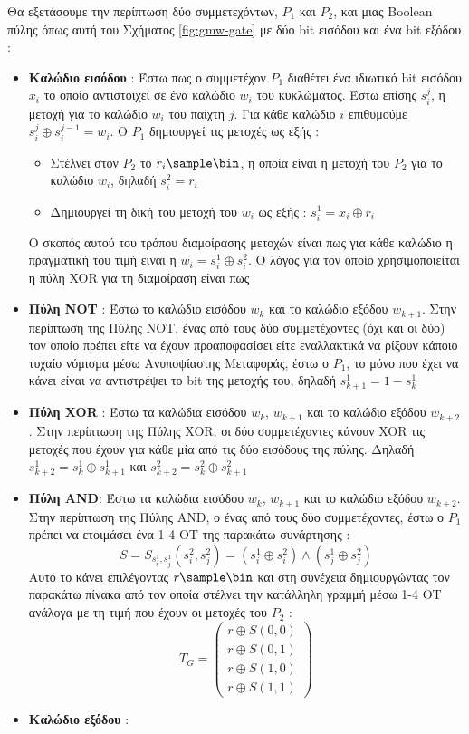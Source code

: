 Θα εξετάσουμε την περίπτωση δύο συμμετεχόντων, $P_1$ και $P_2$, και μιας Boolean πύλης όπως αυτή του Σχήματος \ref{fig:gmw-gate} με δύο bit εισόδου και ένα bit εξόδου :
\begin{itemize}
    \item \textbf{Καλώδιο εισόδου} : Έστω πως ο συμμετέχον $P_1$ διαθέτει ένα ιδιωτικό bit εισόδου $x_i$ το οποίο αντιστοιχεί σε ένα καλώδιο $w_i$ του κυκλώματος. Έστω επίσης $s_i^j$, η μετοχή για το καλώδιο $w_i$ του παίχτη $j$. Για κάθε καλώδιο $i$ επιθυμούμε $s_i^j \oplus s_i^{j-1} = w_i$. Ο $P_1$ δημιουργεί τις μετοχές ως εξής :
    \begin{itemize}
        \item Στέλνει στον $P_2$ το $r_i \sample \bin$, η οποία είναι η μετοχή του $P_2$ για το καλώδιο $w_i$, δηλαδή $s_i^2 = r_i$
        \item Δημιουργεί τη δική του μετοχή του $w_i$ ως εξής : $s_i^1 = x_i \oplus r_i$
    \end{itemize}
    Ο σκοπός αυτού του τρόπου διαμοίρασης μετοχών είναι πως για κάθε καλώδιο η πραγματική του τιμή είναι η $w_i = s_i^1 \oplus s_i^2$. Ο λόγος για τον οποίο χρησιμοποιείται η πύλη XOR για τη διαμοίραση είναι πως
    \item \textbf{Πύλη NOT} : Έστω το καλώδιο εισόδου $w_k$ και το καλώδιο εξόδου $w_{k+1}$. Στην περίπτωση της Πύλης NOT, ένας από τους δύο συμμετέχοντες (όχι και οι δύο) τον οποίο πρέπει είτε να έχουν προαποφασίσει είτε εναλλακτικά να ρίξουν κάποιο τυχαίο νόμισμα μέσω Ανυποψίαστης Μεταφοράς, έστω ο $P_1$, το μόνο που έχει να κάνει είναι να αντιστρέψει το bit της μετοχής του, δηλαδή $s_{k+1}^1 = 1-s_k^1$
    \item \textbf{Πύλη XOR} : Έστω τα καλώδια εισόδου $w_k$, $w_{k+1}$ και το καλώδιο εξόδου $w_{k+2}$. Στην περίπτωση της Πύλης XOR, οι δύο συμμετέχοντες κάνουν XOR τις μετοχές που έχουν για κάθε μία από τις δύο εισόδους της πύλης. Δηλαδή $s_{k+2}^1 = s_{k}^1 \oplus s_{k+1}^1$ και $s_{k+2}^2 = s_k^2 \oplus s_{k+1}^2$
    \item \textbf{Πύλη AND}: Έστω τα καλώδια εισόδου $w_k$, $w_{k+1}$ και το καλώδιο εξόδου $w_{k+2}$. Στην περίπτωση της Πύλης AND, ο ένας από τους δύο συμμετέχοντες, έστω ο $P_1$ πρέπει να ετοιμάσει ένα 1-4 ΟΤ της παρακάτω συνάρτησης :
    \[
    S=S_{s_i^1, s_j^1}\left(s_i^2, s_j^2\right)=\left(s_i^1 \oplus s_i^2\right) \wedge\left(s_j^1 \oplus s_j^2\right)
    \]
    Αυτό το κάνει επιλέγοντας $r \sample \bin$ και στη συνέχεια δημιουργώντας τον παρακάτω πίνακα από τον οποία στέλνει την κατάλληλη γραμμή μέσω 1-4 OT ανάλογα με τη τιμή που έχουν οι μετοχές του $P_2$ :
    \[
    T_G=\left(\begin{array}{l}
                  r \oplus S(0,0) \\
                  r \oplus S(0,1) \\
                  r \oplus S(1,0) \\
                  r \oplus S(1,1)
    \end{array}\right)
    \]
    \item \textbf{Καλώδιο εξόδου} :
\end{itemize}

